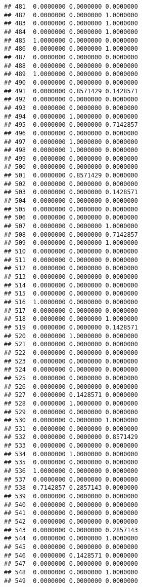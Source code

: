 \documentclass[
]{article}
\begin{document}
\begin{verbatim}
## 481  0.0000000 0.0000000 0.0000000
## 482  0.0000000 0.0000000 1.0000000
## 483  0.0000000 0.0000000 1.0000000
## 484  0.0000000 0.0000000 1.0000000
## 485  1.0000000 0.0000000 0.0000000
## 486  0.0000000 0.0000000 1.0000000
## 487  0.0000000 0.0000000 0.0000000
## 488  0.0000000 0.0000000 0.0000000
## 489  1.0000000 0.0000000 0.0000000
## 490  0.0000000 0.0000000 0.0000000
## 491  0.0000000 0.8571429 0.1428571
## 492  0.0000000 0.0000000 0.0000000
## 493  0.0000000 0.0000000 0.0000000
## 494  0.0000000 1.0000000 0.0000000
## 495  0.0000000 0.0000000 0.7142857
## 496  0.0000000 0.0000000 0.0000000
## 497  0.0000000 1.0000000 0.0000000
## 498  0.0000000 1.0000000 0.0000000
## 499  0.0000000 0.0000000 0.0000000
## 500  0.0000000 0.0000000 0.0000000
## 501  0.0000000 0.8571429 0.0000000
## 502  0.0000000 0.0000000 0.0000000
## 503  0.0000000 0.0000000 0.1428571
## 504  0.0000000 0.0000000 0.0000000
## 505  0.0000000 0.0000000 0.0000000
## 506  0.0000000 0.0000000 0.0000000
## 507  0.0000000 0.0000000 1.0000000
## 508  0.0000000 0.0000000 0.7142857
## 509  0.0000000 0.0000000 1.0000000
## 510  0.0000000 0.0000000 0.0000000
## 511  0.0000000 0.0000000 0.0000000
## 512  0.0000000 0.0000000 0.0000000
## 513  0.0000000 0.0000000 0.0000000
## 514  0.0000000 0.0000000 0.0000000
## 515  0.0000000 0.0000000 0.0000000
## 516  1.0000000 0.0000000 0.0000000
## 517  0.0000000 0.0000000 0.0000000
## 518  0.0000000 0.0000000 1.0000000
## 519  0.0000000 0.0000000 0.1428571
## 520  0.0000000 1.0000000 0.0000000
## 521  0.0000000 0.0000000 0.0000000
## 522  0.0000000 0.0000000 0.0000000
## 523  0.0000000 0.0000000 0.0000000
## 524  0.0000000 0.0000000 0.0000000
## 525  0.0000000 0.0000000 0.0000000
## 526  0.0000000 0.0000000 0.0000000
## 527  0.0000000 0.1428571 0.0000000
## 528  0.0000000 1.0000000 0.0000000
## 529  0.0000000 0.0000000 0.0000000
## 530  0.0000000 0.0000000 1.0000000
## 531  0.0000000 0.0000000 0.0000000
## 532  0.0000000 0.0000000 0.8571429
## 533  0.0000000 0.0000000 0.0000000
## 534  0.0000000 1.0000000 0.0000000
## 535  0.0000000 0.0000000 0.0000000
## 536  1.0000000 0.0000000 0.0000000
## 537  0.0000000 0.0000000 0.0000000
## 538  0.7142857 0.2857143 0.0000000
## 539  0.0000000 0.0000000 0.0000000
## 540  0.0000000 0.0000000 0.0000000
## 541  0.0000000 0.0000000 0.0000000
## 542  0.0000000 0.0000000 0.0000000
## 543  0.0000000 0.0000000 0.2857143
## 544  0.0000000 0.0000000 1.0000000
## 545  0.0000000 0.0000000 0.0000000
## 546  0.0000000 0.1428571 0.0000000
## 547  0.0000000 0.0000000 0.0000000
## 548  0.0000000 0.0000000 1.0000000
## 549  0.0000000 0.0000000 0.0000000

\end{verbatim}
\end{document}
